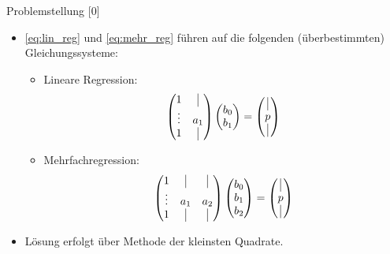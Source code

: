 \documentclass{beamer}
\begin{document}
\begin{frame}{Problemstellung [0]}
	\begin{itemize}
		\item \eqref{eq:lin_reg} und \eqref{eq:mehr_reg} führen auf die folgenden (überbestimmten) Gleichungssysteme:
		\begin{itemize}
			\item Lineare Regression:
			\begin{align}
			\begin{pmatrix}
			1 & \vrule \\
			\vdots & a_1\\
			1 & \vrule
			\end{pmatrix}
			\begin{pmatrix}
			b_0\\
			b_1
			\end{pmatrix}
			=
			\begin{pmatrix}
			\vrule\\
			p\\
			\vrule
			\end{pmatrix}
			\end{align}
			\item Mehrfachregression:
			\begin{align}
			\begin{pmatrix}
			1 & \vrule & \vrule\\
			\vdots & a_1&a_2\\
			1 & \vrule &\vrule
			\end{pmatrix}
			\begin{pmatrix}
			b_0\\
			b_1\\
			b_2
			\end{pmatrix}
			=
			\begin{pmatrix}
			\vrule\\
			p\\
			\vrule
			\end{pmatrix}
			\end{align}
		\pause
		\end{itemize}
		\item Lösung erfolgt über Methode der kleinsten Quadrate.
	\end{itemize}
\end{frame}
\end{document}

